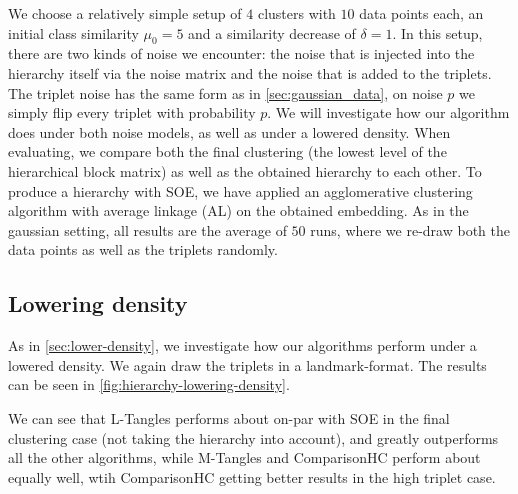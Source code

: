 We choose a relatively simple setup of $4$ clusters with $10$ data points each, an initial class similarity $\mu_0 = 5$ and a similarity decrease of $\delta = 1$.
In this setup, there are two kinds of noise we encounter: the noise that is injected into the hierarchy itself via the noise matrix and the noise that is added to the triplets.
The triplet noise has the same form as in \autoref{sec:gaussian_data}, on noise $p$ we simply flip every triplet with probability $p$. We will investigate how our algorithm does
under both noise models, as well as under a lowered density.  When evaluating, we compare both the final clustering (the lowest level of the hierarchical block matrix) as well as the obtained hierarchy to each other. 
To produce a hierarchy with SOE, we have applied an agglomerative clustering algorithm with average linkage (AL) on the obtained embedding.
As in the gaussian setting, all results are the average of $50$ runs, where we re-draw both the data points as well as the triplets randomly. 

\subsection{Lowering density}
As in \autoref{sec:lower-density}, we investigate how our algorithms perform under a lowered density. 
We again draw the triplets in a landmark-format. The results can be seen in 
\autoref{fig:hierarchy-lowering-density}. 

We can see that L-Tangles performs about on-par with SOE in the final clustering case (not taking the hierarchy into account), and greatly outperforms all the other 
algorithms, while M-Tangles and ComparisonHC perform about equally well, wtih ComparisonHC getting better results in the high triplet case.


